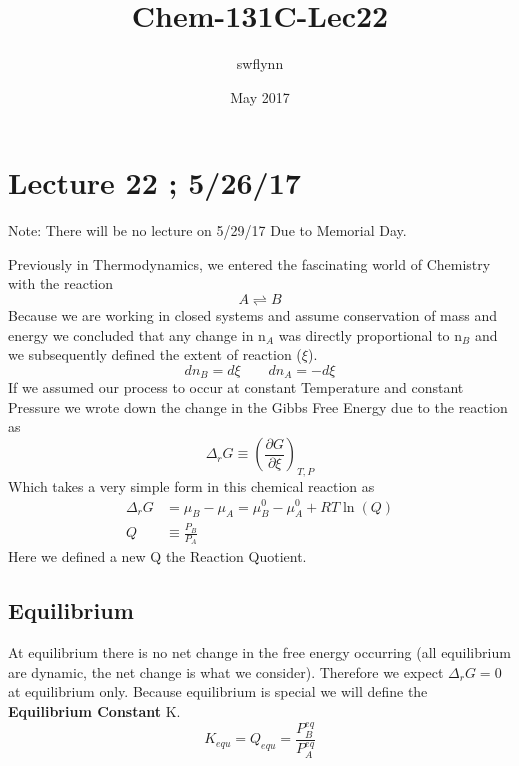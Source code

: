 \documentclass{article}
\title{Chem-131C-Lec22}
\author{swflynn}
\date{May 2017}
\begin{document}
\maketitle

\section*{Lecture 22 ; 5/26/17}
Note: There will be no lecture on 5/29/17 Due to Memorial Day.

Previously in Thermodynamics, we entered the fascinating world of Chemistry with the reaction 
\begin{equation}
    A \rightleftharpoons B 
\end{equation}
Because we are working in closed systems and assume conservation of mass and energy we concluded that any change in n$_A$ was directly proportional to n$_B$ and we subsequently defined the extent of reaction ($\xi$). 
\begin{equation}
dn_B = d\xi \qquad dn_A = -d\xi
\end{equation}
If we assumed our process to occur at constant Temperature and constant Pressure we wrote down the change in the Gibbs Free Energy due to the reaction as 
\begin{equation}
\Delta_rG \equiv \left(\frac{\partial G}{\partial \xi}\right)_{T,P}
\end{equation}
Which takes a very simple form in this chemical reaction as 
\begin{equation}
    \begin{split}
        \Delta_rG &= \mu_B - \mu_A = \mu_B^0 - \mu_A^0 + RT\ln\left(Q\right) \\
        Q &\equiv \frac{P_B}{P_A}
    \end{split}
\end{equation}
Here we defined a new Q the Reaction Quotient. 

\subsection*{Equilibrium}
At equilibrium there is no net change in the free energy occurring (all equilibrium are dynamic, the net change is what we consider). 
Therefore we expect $\Delta_rG = 0$ at equilibrium only. 
Because equilibrium is special we will define the \textbf{Equilibrium Constant} K.
\begin{equation}
    K_{equ} = Q_{equ} = \frac{P_B^{eq}}{P_A^{eq}}
\end{equation}
\end{document}
